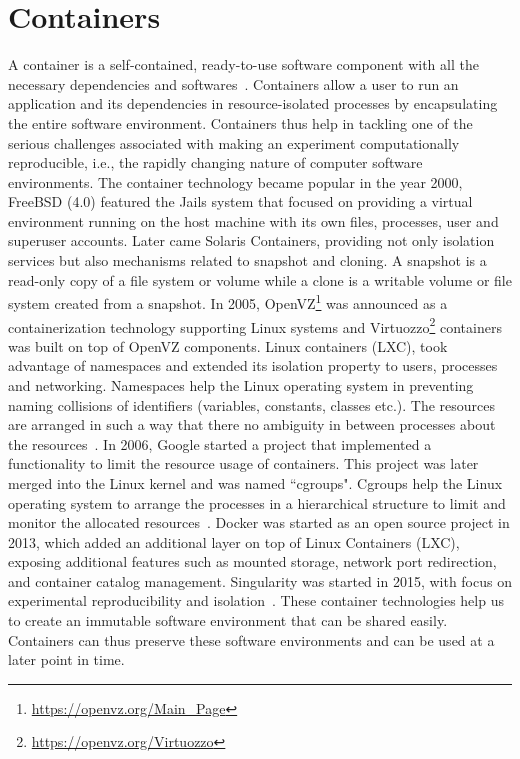 \section{Containers}\label{containers}
A container is a self-contained, ready-to-use software component with all the necessary dependencies and softwares~\cite{7158965}. Containers allow a user to run an application and its dependencies in resource-isolated processes by encapsulating the entire software environment. Containers thus help in tackling one of the serious challenges associated with making an experiment computationally reproducible, i.e., the rapidly changing nature of computer software environments.
The container technology became popular in the year 2000, FreeBSD (4.0) featured the Jails system that focused on providing a virtual environment running on the host machine with its own files, processes, user and superuser accounts. Later came Solaris Containers, providing not only isolation services but also mechanisms related to snapshot and cloning. A snapshot is a read-only copy of a file system or volume while a clone is a writable volume or file system created from a snapshot. In 2005, OpenVZ\footnote{\url{https://openvz.org/Main_Page}} was announced as a containerization technology supporting Linux systems and Virtuozzo\footnote{\url{https://openvz.org/Virtuozzo}} containers was built on top of OpenVZ components. Linux containers (LXC), took advantage of namespaces and extended its isolation property to users, processes and networking.
Namespaces help the Linux operating system in preventing naming collisions of identifiers (variables, constants, classes etc.). The resources are arranged in such a way that there no ambiguity in between processes about the resources~\cite{namespaces}. In 2006, Google started a project that implemented a functionality to limit the resource usage of containers. This project was later merged into the Linux kernel and was named ``cgroups". Cgroups help the Linux operating system to arrange the processes in a hierarchical structure to limit and monitor the allocated resources~\cite{cgroups}. Docker was started as an open source project in 2013, which added an additional layer on top of Linux Containers (LXC), exposing additional features such as mounted storage, network port redirection, and container catalog management. Singularity was started in 2015, with focus on experimental reproducibility and isolation~\cite{Xavier:2013:PEC:2497369.2497577}. These container technologies help us to create an immutable software environment that can be shared easily. Containers can thus preserve these software environments and can be used at a later point in time.

